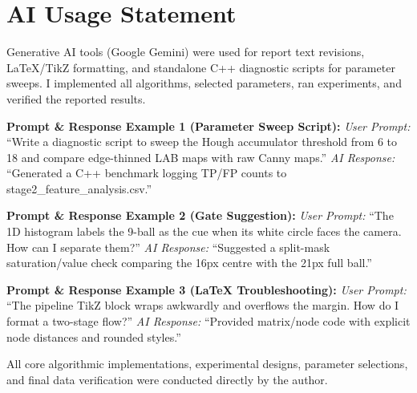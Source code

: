 \documentclass[12pt,a4paper]{article}
\begin{document}
\newpage
\section*{AI Usage Statement}

Generative AI tools (Google Gemini) were used for report text revisions, LaTeX/TikZ formatting, and standalone C++ diagnostic scripts for parameter sweeps. I implemented all algorithms, selected parameters, ran experiments, and verified the reported results.

\textbf{Prompt \& Response Example 1 (Parameter Sweep Script):} \textit{User Prompt:} ``Write a diagnostic script to sweep the Hough accumulator threshold from 6 to 18 and compare edge-thinned LAB maps with raw Canny maps.'' \textit{AI Response:} ``Generated a C++ benchmark logging TP/FP counts to stage2\_feature\_analysis.csv.''

\textbf{Prompt \& Response Example 2 (Gate Suggestion):} \textit{User Prompt:} ``The 1D histogram labels the 9-ball as the cue when its white circle faces the camera. How can I separate them?'' \textit{AI Response:} ``Suggested a split-mask saturation/value check comparing the 16px centre with the 21px full ball.''

\textbf{Prompt \& Response Example 3 (LaTeX Troubleshooting):} \textit{User Prompt:} ``The pipeline TikZ block wraps awkwardly and overflows the margin. How do I format a two-stage flow?'' \textit{AI Response:} ``Provided matrix/node code with explicit node distances and rounded styles.''

All core algorithmic implementations, experimental designs, parameter selections, and final data verification were conducted directly by the author.
\end{document}
